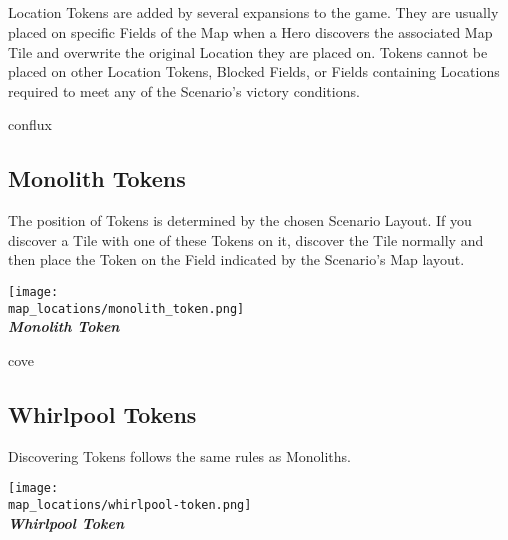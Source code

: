 \begin{multicols}{2}
\subsection*{}
Location Tokens are added by several expansions to the game.
They are usually placed on specific Fields of the Map when a Hero discovers the associated Map Tile and overwrite the original Location they are placed on.
Tokens cannot be placed on other Location Tokens, Blocked Fields, or Fields containing Locations required to meet any of the Scenario's victory conditions.

\begin{expansion}[before=\vspace*{0pt}]{conflux}
  \subsection*{Monolith Tokens}
   The position of  Tokens is determined by the chosen Scenario Layout.
   If you discover a Tile with one of these Tokens on it, discover the Tile normally and then place the Token on the Field indicated by the Scenario's Map layout.
  \bigskip
  \begin{center}
    \texttt{[image: \\map\_locations/monolith\_token.png]}\\
    \footnotesize{\textbf{\textit{\textcolor{darkcandyapplered}{Monolith Token}}}}
  \end{center}
\end{expansion}

\bigskip

\begin{expansion}[before=\vspace*{0pt}]{cove}
  \subsection*{Whirlpool Tokens}
  Discovering  Tokens follows the same rules as Monoliths.
  \bigskip
  \begin{center}
    \texttt{[image: \\map\_locations/whirlpool-token.png]}\\
    \footnotesize{\textbf{\textit{\textcolor{darkcandyapplered}{Whirlpool Token}}}}
  \end{center}
\end{expansion}


\end{multicols}
